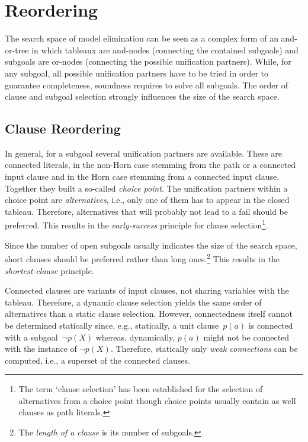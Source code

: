\section{Reordering}

The search space of model elimination can be seen as a complex form of
an  and-or-tree in which tableaux are and-nodes (connecting the
contained subgoals)  and subgoals are or-nodes (connecting the
possible unification partners).  
While, for any subgoal, all possible unification partners have to be
tried in order to guarantee completeness, soundness requires to solve
all subgoals. 
The order of clause and subgoal selection strongly influences the size
of the search space.

\subsection{Clause Reordering}

In general, for a subgoal several unification partners are available.
These are connected literals, in the non-Horn case stemming from the
path or a connected input clause and in the Horn case stemming from a
connected input clause.
Together they built a so-called {\em choice point\/}.  
The unification partners within a choice point are {\em
alternatives\/}, i.e., only one of them has to appear in the closed
tableau. 
Therefore, alternatives that will probably not lead to a fail should
be preferred. 
This results in the {\em early-success\/} principle for clause
selection\footnote{The term `clause selection' has been established
  for the selection of alternatives from a choice point though
  choice points usually contain as well clauses as path literals.}.

Since the number of open subgoals usually indicates the size of the
search space, short clauses should be preferred rather than long
ones.\footnote{The {\em length of a clause\/} is its number of
	subgoals.} 
This results in the {\em shortest-clause\/} principle.

Connected clauses are variants of input clauses, not sharing variables
with the tableau.
Therefore, a dynamic clause selection yields the same order of
alternatives than a static clause selection.   
However, connectedness itself cannot be determined statically since,
e.g., statically, a unit clause~$p(a)$ is connected with a
subgoal~$\neg p(X)$ whereas, dynamically, $p(a)$ might not be
connected with the instance of $\neg p(X)$.
Therefore, statically only {\em weak connections\/} can be computed,
i.e., a superset of the connected clauses.

